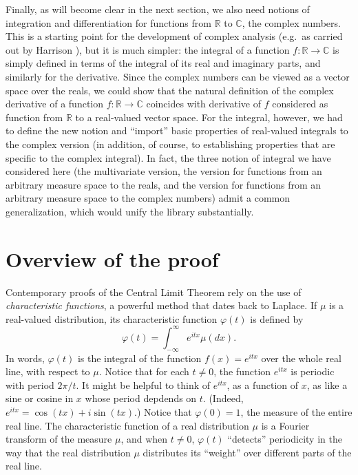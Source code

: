 \documentclass{article}
\newcommand{\RR}{\mathbb{R}}
\newcommand{\CC}{\mathbb{C}}
\newcommand{\ph}{\varphi}
\begin{document}
Finally, as will become clear in the next section, we also need notions of integration and differentiation for functions from $\RR$ to $\CC$, the complex numbers. This is a starting point for the development of complex analysis (e.g.~as carried out by Harrison \cite{harrison:07}), but it is much simpler: the integral of a function $f : \RR \to \CC$ is simply defined in terms of the integral of its real and imaginary parts, and similarly for the derivative. Since the complex numbers can be viewed as a vector space over the reals, we could show that the natural definition of the complex derivative of a function $f : \RR \to \CC$ coincides with derivative of $f$ considered as function from $\RR$ to a real-valued vector space. For the integral, however, we had to define the new notion and ``import'' basic properties of real-valued integrals to the complex version (in addition, of course, to establishing properties that are specific to the complex integral). In fact, the three notion of integral we have considered here (the multivariate version, the version for functions from an arbitrary measure space to the reals, and the version for functions from an arbitrary measure space to the complex numbers) admit a common generalization, which would unify the library substantially. 


\section{Overview of the proof}

Contemporary proofs of the Central Limit Theorem rely on the use of \emph{characteristic functions}, a powerful method that dates back to Laplace. If $\mu$ is a real-valued distribution, its characteristic function $\ph(t)$ is defined by
\[
\ph(t) = \int_{-\infty}^{\infty} e^{itx} \mu(dx).
\]
In words, $\ph(t)$ is the integral of the function $f(x) = e^{itx}$ over the whole real line, with respect to $\mu$. Notice that for each $t \neq 0$, the function $e^{itx}$ is periodic with period $2 \pi / t$. It might be helpful to think of $e^{itx}$, as a function of $x$, as like a sine or cosine in $x$ whose period depdends on $t$. (Indeed, $e^{itx}= \cos (t x) + i \sin (t x)$.) Notice that $\ph(0) = 1$, the measure of the entire real line. The characteristic function of a real distribution $\mu$ is a Fourier transform of the measure $\mu$, and when $t \neq 0$, $\ph(t)$ ``detects'' periodicity in the way that the real distribution $\mu$ distributes its ``weight'' over different parts of the real line. 
\end{document}
